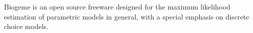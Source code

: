 Biogeme is an open source freeware designed for the maximum likelihood estimation of parametric models in general, with a special emphasis on discrete choice models. 